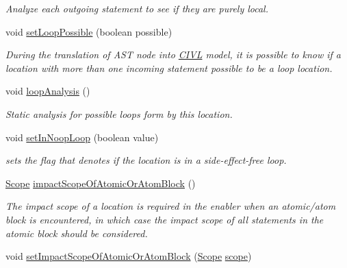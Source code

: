 \begin{DoxyCompactItemize}
\begin{DoxyCompactList}\small\item\em Analyze each outgoing statement to see if they are purely local. \end{DoxyCompactList}\item 
void \hyperlink{interfaceedu_1_1udel_1_1cis_1_1vsl_1_1civl_1_1model_1_1IF_1_1location_1_1Location_a0d8b081d18ffa767de8d93fa1b4f0f52}{set\+Loop\+Possible} (boolean possible)
\begin{DoxyCompactList}\small\item\em During the translation of A\+S\+T node into \hyperlink{classedu_1_1udel_1_1cis_1_1vsl_1_1civl_1_1CIVL}{C\+I\+V\+L} model, it is possible to know if a location with more than one incoming statement possible to be a loop location. \end{DoxyCompactList}\item 
void \hyperlink{interfaceedu_1_1udel_1_1cis_1_1vsl_1_1civl_1_1model_1_1IF_1_1location_1_1Location_a83901507942e6fa390dc355a28a7d6d2}{loop\+Analysis} ()
\begin{DoxyCompactList}\small\item\em Static analysis for possible loops form by this location. \end{DoxyCompactList}\item 
void \hyperlink{interfaceedu_1_1udel_1_1cis_1_1vsl_1_1civl_1_1model_1_1IF_1_1location_1_1Location_ae775a2079bb9a4b84f069fd33daceed8}{set\+In\+Noop\+Loop} (boolean value)
\begin{DoxyCompactList}\small\item\em sets the flag that denotes if the location is in a side-\/effect-\/free loop. \end{DoxyCompactList}\item 
\hyperlink{interfaceedu_1_1udel_1_1cis_1_1vsl_1_1civl_1_1model_1_1IF_1_1Scope}{Scope} \hyperlink{interfaceedu_1_1udel_1_1cis_1_1vsl_1_1civl_1_1model_1_1IF_1_1location_1_1Location_ad8d174a772556d876e26b768292258fc}{impact\+Scope\+Of\+Atomic\+Or\+Atom\+Block} ()
\begin{DoxyCompactList}\small\item\em The impact scope of a location is required in the enabler when an atomic/atom block is encountered, in which case the impact scope of all statements in the atomic block should be considered. \end{DoxyCompactList}\item 
void \hyperlink{interfaceedu_1_1udel_1_1cis_1_1vsl_1_1civl_1_1model_1_1IF_1_1location_1_1Location_a7a4328a7a88f89edf77670f7ff8f3f33}{set\+Impact\+Scope\+Of\+Atomic\+Or\+Atom\+Block} (\hyperlink{interfaceedu_1_1udel_1_1cis_1_1vsl_1_1civl_1_1model_1_1IF_1_1Scope}{Scope} \hyperlink{interfaceedu_1_1udel_1_1cis_1_1vsl_1_1civl_1_1model_1_1IF_1_1location_1_1Location_acca7f0ca8077f826b1f7c60bf5d7af31}{scope})

\end{DoxyCompactItemize}
